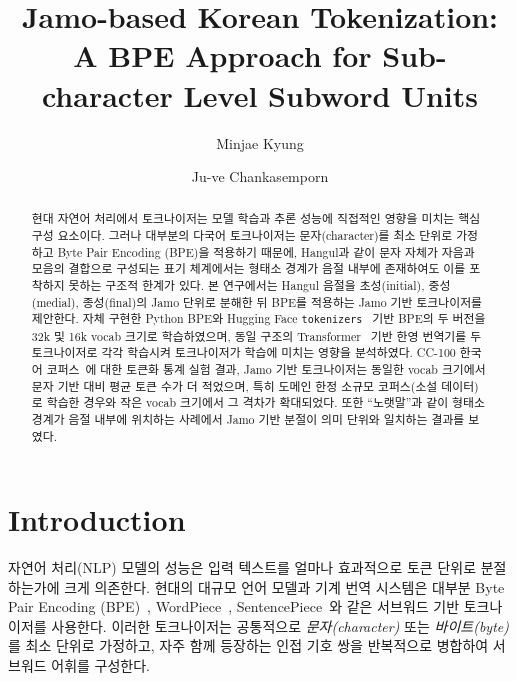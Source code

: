 \documentclass[sigconf,nonacm]{acmart}
\begin{document}
\title{Jamo-based Korean Tokenization: \\
A BPE Approach for Sub-character Level Subword Units}

\author{Minjae Kyung}

\author{Ju-ve Chankasemporn}


\begin{abstract}
현대 자연어 처리에서 토크나이저는 모델 학습과 추론 성능에 직접적인 영향을 미치는 핵심 구성 요소이다.
그러나 대부분의 다국어 토크나이저는 문자(character)를 최소 단위로 가정하고 Byte Pair Encoding (BPE)을 적용하기 때문에,
Hangul과 같이 문자 자체가 자음과 모음의 결합으로 구성되는 표기 체계에서는
형태소 경계가 음절 내부에 존재하여도 이를 포착하지 못하는 구조적 한계가 있다.
본 연구에서는 Hangul 음절을 초성(initial), 중성(medial), 종성(final)의 Jamo 단위로 분해한 뒤
BPE를 적용하는 Jamo 기반 토크나이저를 제안한다. 자체 구현한 Python BPE와
Hugging Face \texttt{tokenizers}~\cite{huggingface_tokenizers} 기반 BPE의 두 버전을 32k 및 16k vocab
크기로 학습하였으며, 동일 구조의 Transformer~\cite{vaswani2017attention} 기반 한영 번역기를 두 토크나이저로
각각 학습시켜 토크나이저가 학습에 미치는 영향을 분석하였다. CC-100 한국어 코퍼스~\cite{conneau2020cc100}에 대한
토큰화 통계 실험 결과, Jamo 기반 토크나이저는 동일한 vocab 크기에서 문자 기반 대비 평균 토큰 수가 더 적었으며,
특히 도메인 한정 소규모 코퍼스(소설 데이터)로 학습한 경우와 작은 vocab 크기에서 그 격차가 확대되었다. 또한 ``노랫말''과 같이 형태소 경계가
음절 내부에 위치하는 사례에서 Jamo 기반 분절이 의미 단위와 일치하는 결과를 보였다.
\end{abstract}


\maketitle

\section{Introduction}
\label{sec:intro}

자연어 처리(NLP) 모델의 성능은 입력 텍스트를 얼마나 효과적으로 토큰 단위로 분절하는가에 크게 의존한다.
현대의 대규모 언어 모델과 기계 번역 시스템은 대부분 Byte Pair Encoding (BPE)~\cite{sennrich2016bpe},
WordPiece~\cite{wu2016google}, SentencePiece~\cite{kudo2018sentencepiece}와 같은 서브워드 기반
토크나이저를 사용한다. 이러한 토크나이저는 공통적으로 \emph{문자(character)} 또는 \emph{바이트(byte)}를
최소 단위로 가정하고, 자주 함께 등장하는 인접 기호 쌍을 반복적으로 병합하여 서브워드 어휘를 구성한다.
\end{document}
